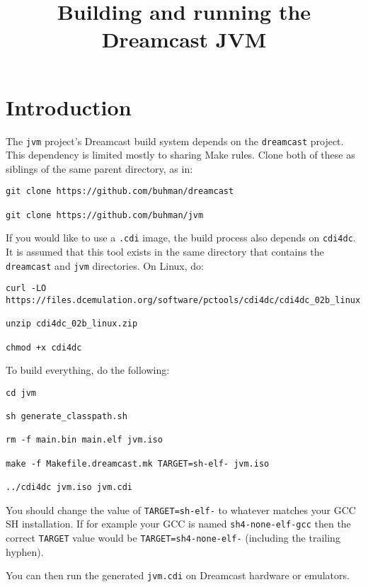 \documentclass[20pt]{article}
\title{Building and running the Dreamcast JVM}
\date{}
\begin{document}
\maketitle

\tableofcontents
\section{Introduction}

The \texttt{jvm} project's Dreamcast build system depends on the
\texttt{dreamcast} project. This dependency is limited mostly to sharing Make
rules. Clone both of these as siblings of the same parent directory, as in:

\begin{verbatim}
git clone https://github.com/buhman/dreamcast

git clone https://github.com/buhman/jvm
\end{verbatim}

If you would like to use a \texttt{.cdi} image, the build process also depends
on \texttt{cdi4dc}. It is assumed that this tool exists in the same directory
that contains the \texttt{dreamcast} and \texttt{jvm} directories. On Linux, do:

\begin{verbatim}
curl -LO https://files.dcemulation.org/software/pctools/cdi4dc/cdi4dc_02b_linux.zip

unzip cdi4dc_02b_linux.zip

chmod +x cdi4dc
\end{verbatim}

To build everything, do the following:

\begin{verbatim}
cd jvm

sh generate_classpath.sh

rm -f main.bin main.elf jvm.iso

make -f Makefile.dreamcast.mk TARGET=sh-elf- jvm.iso

../cdi4dc jvm.iso jvm.cdi
\end{verbatim}

You should change the value of \texttt{TARGET=sh-elf-} to whatever matches your
GCC SH installation. If for example your GCC is named \texttt{sh4-none-elf-gcc}
then the correct \texttt{TARGET} value would be \texttt{TARGET=sh4-none-elf-}
(including the trailing hyphen).

You can then run the generated \texttt{jvm.cdi} on Dreamcast hardware or
emulators.
\end{document}

